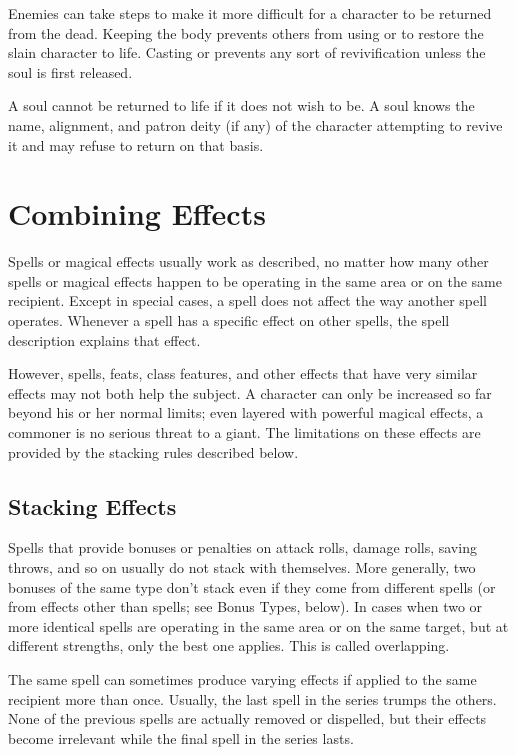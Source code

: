  Enemies can take steps to make it more difficult for a character to be returned from the dead. Keeping the body prevents others from using   or  to restore the slain character to life. Casting  or  prevents any sort of revivification unless the soul is first released.

 A soul cannot be returned to life if it does not wish to be. A soul knows the name, alignment, and patron deity (if any) of the character attempting to revive it and may refuse to return on that basis.

\section{Combining Effects}
Spells or magical effects usually work as described, no matter how many other spells or magical effects happen to be operating in the same area or on the same recipient. Except in special cases, a spell does not affect the way another spell operates. Whenever a spell has a specific effect on other spells, the spell description explains that effect.

However, spells, feats, class features, and other effects that have very similar effects may not both help the subject. A character can only be increased so far beyond his or her normal limits; even layered with powerful magical effects, a commoner is no serious threat to a giant. The limitations on these effects are provided by the stacking rules described below.

\subsection{Stacking Effects}
Spells that provide bonuses or penalties on attack rolls, damage rolls, saving throws, and so on usually do not stack with themselves. More generally, two bonuses of the same type don't stack even if they come from different spells (or from effects other than spells; see Bonus Types, below).
 In cases when two or more identical spells are operating in the same area or on the same target, but at different strengths, only the best one applies. This is called overlapping.

 The same spell can sometimes produce varying effects if applied to the same recipient more than once. Usually, the last spell in the series trumps the others. None of the previous spells are actually removed or dispelled, but their effects become irrelevant while the final spell in the series lasts.

